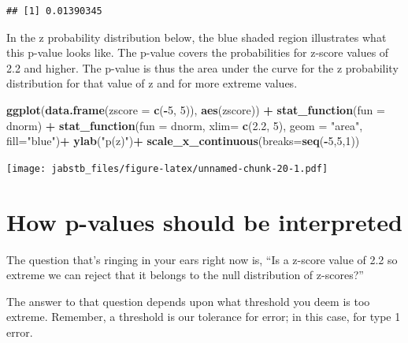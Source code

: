 \documentclass[]{book}
\newenvironment{Shaded}{\begin{snugshade}}{\end{snugshade}}
\newcommand{\DataTypeTok}[1]{\textcolor[rgb]{0.13,0.29,0.53}{#1}}
\newcommand{\DecValTok}[1]{\textcolor[rgb]{0.00,0.00,0.81}{#1}}
\newcommand{\FloatTok}[1]{\textcolor[rgb]{0.00,0.00,0.81}{#1}}
\newcommand{\KeywordTok}[1]{\textcolor[rgb]{0.13,0.29,0.53}{\textbf{#1}}}
\newcommand{\NormalTok}[1]{#1}
\newcommand{\OperatorTok}[1]{\textcolor[rgb]{0.81,0.36,0.00}{\textbf{#1}}}
\newcommand{\StringTok}[1]{\textcolor[rgb]{0.31,0.60,0.02}{#1}}
\begin{document}
\begin{verbatim}
## [1] 0.01390345
\end{verbatim}

In the z probability distribution below, the blue shaded region illustrates what this p-value looks like. The p-value covers the probabilities for z-score values of 2.2 and higher. The p-value is thus the area under the curve for the z probability distribution for that value of z and for more extreme values.

\begin{Shaded}
\begin{Highlighting}[]
\KeywordTok{ggplot}\NormalTok{(}\KeywordTok{data.frame}\NormalTok{(}\DataTypeTok{zscore =} \KeywordTok{c}\NormalTok{(}\OperatorTok{-}\DecValTok{5}\NormalTok{, }\DecValTok{5}\NormalTok{)), }\KeywordTok{aes}\NormalTok{(zscore)) }\OperatorTok{+}
\StringTok{  }\KeywordTok{stat_function}\NormalTok{(}\DataTypeTok{fun =}\NormalTok{ dnorm) }\OperatorTok{+}
\StringTok{  }\KeywordTok{stat_function}\NormalTok{(}\DataTypeTok{fun =}\NormalTok{ dnorm,}
                \DataTypeTok{xlim=} \KeywordTok{c}\NormalTok{(}\FloatTok{2.2}\NormalTok{, }\DecValTok{5}\NormalTok{),}
                \DataTypeTok{geom =} \StringTok{"area"}\NormalTok{, }\DataTypeTok{fill=}\StringTok{"blue"}\NormalTok{)}\OperatorTok{+}
\StringTok{  }\KeywordTok{ylab}\NormalTok{(}\StringTok{"p(z)"}\NormalTok{)}\OperatorTok{+}
\StringTok{  }\KeywordTok{scale_x_continuous}\NormalTok{(}\DataTypeTok{breaks=}\KeywordTok{seq}\NormalTok{(}\OperatorTok{-}\DecValTok{5}\NormalTok{,}\DecValTok{5}\NormalTok{,}\DecValTok{1}\NormalTok{))}
\end{Highlighting}
\end{Shaded}

\texttt{[image: jabstb\_files/figure-latex/unnamed-chunk-20-1.pdf]}

\hypertarget{how-p-values-should-be-interpreted}{%
\section{How p-values should be interpreted}\label{how-p-values-should-be-interpreted}}

The question that's ringing in your ears right now is, ``Is a z-score value of 2.2 so extreme we can reject that it belongs to the null distribution of z-scores?''

The answer to that question depends upon what threshold you deem is too extreme. Remember, a threshold is our tolerance for error; in this case, for type 1 error.
\end{document}
